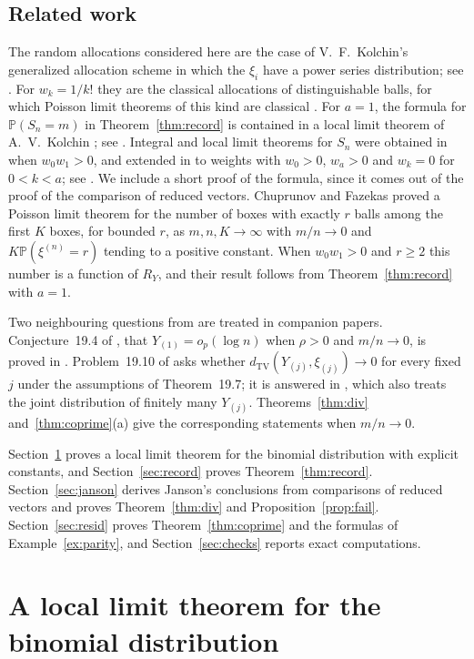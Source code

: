 \documentclass[11pt]{amsart}
\theoremstyle{definition}
\theoremstyle{remark}
\numberwithin{equation}{section}
\newcommand{\Pp}{\mathbb P}
\newcommand{\dtv}{d_{\mathrm{TV}}}
\begin{document}
\subsection*{Related work}
The random allocations considered here are the case of V.~F.~Kolchin's generalized allocation scheme \cite{Kol68} in which the $\xi_i$ have a power series distribution; see \cite{Kol99,Pav00,J12}. For $w_k=1/k!$ they are the classical allocations of distinguishable balls, for which Poisson limit theorems of this kind are classical \cite{KSC78}. For $a=1$, the formula for $\Pp(S_n=m)$ in Theorem~\ref{thm:record} is contained in a local limit theorem of A.~V.~Kolchin \cite[Theorem~5]{Kol03}; see \cite[Lemma~2.1]{CF19}. Integral and local limit theorems for $S_n$ were obtained in \cite{Kol03} when $w_0w_1>0$, and extended in \cite{KK06,KK07} to weights with $w_0>0$, $w_a>0$ and $w_k=0$ for $0<k<a$; see \cite[Section~2]{CF19}. We include a short proof of the formula, since it comes out of the proof of the comparison of reduced vectors. Chuprunov and Fazekas \cite[Theorem~2.2]{CF19} proved a Poisson limit theorem for the number of boxes with exactly $r$ balls among the first $K$ boxes, for bounded $r$, as $m,n,K\to\infty$ with $m/n\to0$ and $K\Pp(\xi^{(n)}=r)$ tending to a positive constant. When $w_0w_1>0$ and $r\ge2$ this number is a function of $R_Y$, and their result follows from Theorem~\ref{thm:record} with $a=1$.

Two neighbouring questions from \cite{J12} are treated in companion papers. Conjecture~19.4 of \cite{J12}, that $Y_{(1)}=o_p(\log n)$ when $\rho>0$ and $m/n\to0$, is proved in \cite{S26a}. Problem~19.10 of \cite{J12} asks whether $\dtv(Y_{(j)},\xi_{(j)})\to0$ for every fixed $j$ under the assumptions of Theorem~19.7; it is answered in \cite{S26b}, which also treats the joint distribution of finitely many $Y_{(j)}$. Theorems~\ref{thm:div} and~\ref{thm:coprime}(a) give the corresponding statements when $m/n\to0$.

Section~\ref{sec:llt} proves a local limit theorem for the binomial distribution with explicit constants, and Section~\ref{sec:record} proves Theorem~\ref{thm:record}. Section~\ref{sec:janson} derives Janson's conclusions from comparisons of reduced vectors and proves Theorem~\ref{thm:div} and Proposition~\ref{prop:fail}. Section~\ref{sec:resid} proves Theorem~\ref{thm:coprime} and the formulas of Example~\ref{ex:parity}, and Section~\ref{sec:checks} reports exact computations.

\section{A local limit theorem for the binomial distribution}\label{sec:llt}
\end{document}
